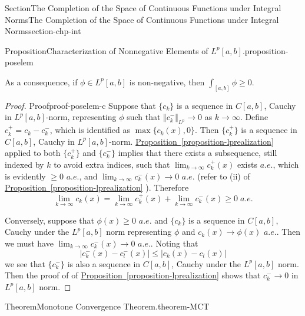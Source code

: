 \documentclass[oneside,10pt,]{article}
\newcommand{\xreffont}{\relax}
\numberwithin{equation}{section}
\begin{document}
\begin{sectionptx}{Section}{The Completion of the Space of Continuous Functions under Integral Norms}{}{The Completion of the Space of Continuous Functions under Integral Norms}{}{}{section-chp-int}
\begin{proposition}{Proposition}{Characterization of Nonnegative Elements of \(L^{p}[a, b]\).}{}{proposition-poselem}
\par
As a consequence, if \(\phi \in L^{p}[a, b]\) is non-negative, then \(\int_{[a, b]} \phi \ge 0\).\footnotemark{}%
\end{proposition}
\begin{proof}{Proof}{}{proof-poselem-c}
Suppose that \(\{ c_{k}\}\) is a sequence in \(C[a, b]\), Cauchy in \(L^{p}[a, b]\)-norm, representing \(\phi\) such that \(\Vert c_{k}^{-} \Vert_{L^{p}}\to 0\) as \(k\to \infty\). Define \(c_{k}^{+}=c_{k}- c_{k}^{-}\), which is identified as \(\max\{ c_{k}(x), 0\}\). Then \(\{ c_{k}^{+}\}\) is a sequence in \(C[a, b]\), Cauchy in \(L^{p}[a, b]\)-norm. \hyperref[proposition-lprealization]{Proposition~{\xreffont\ref{proposition-lprealization}}} applied to both \(\{ c_{k}^{+}\}\) and \(\{ c_{k}^{-}\}\) implies that there exists a subsequence, still indexed by \(k\) to avoid extra indices, such that \(\lim_{k\to \infty} c_{k}^{+}(x)\) exists \(a.e.\), which is evidently \(\ge 0\) \(a.e.\), and \(\lim_{k\to \infty} c_{k}^{-}(x)\to 0\) \(a.e.\) (refer to (ii) of \hyperref[proposition-lprealization]{Proposition~{\xreffont\ref{proposition-lprealization}}} ). Therefore%
\begin{equation*}
\lim_{k\to \infty} c_{k}(x)= \lim_{k\to \infty} c_{k}^{+}(x) + \lim_{k\to \infty} c_{k}^{-}(x)\ge 0 \; a.e.
\end{equation*}
%
\par
Conversely, suppose that \(\phi (x)\ge 0\) \(a.e.\) and \(\{c_{k}\}\) is a  sequence in \(C[a, b]\), Cauchy under the \(L^{p}[a, b]\) norm representing \(\phi\) and \(c_{k}(x)\to \phi(x)\) \(a.e.\).  Then we must have \(\lim_{k\to \infty} c_{k}^{-}(x)\to 0\) \(a.e.\). Noting that%
\begin{equation*}
\vert c_{k}^{-}(x) - c_{l}^{-}(x)\vert \le \vert c_{k}(x) - c_{l}(x)\vert
\end{equation*}
we see that \(\{ c_{k}^{-}\}\) is also a sequence in \(C[a, b]\), Cauchy under the \(L^{p}[a, b]\) norm. Then the proof of of \hyperref[proposition-lprealization]{Proposition~{\xreffont\ref{proposition-lprealization}}} shows that \(c_{k}^{-}\to 0\) in \(L^{p}[a, b]\) norm.%
\end{proof}
%
\begin{theorem}{Theorem}{Monotone Convergence Theorem.}{}{theorem-MCT}%

\end{theorem}
\end{sectionptx}
\end{document}
